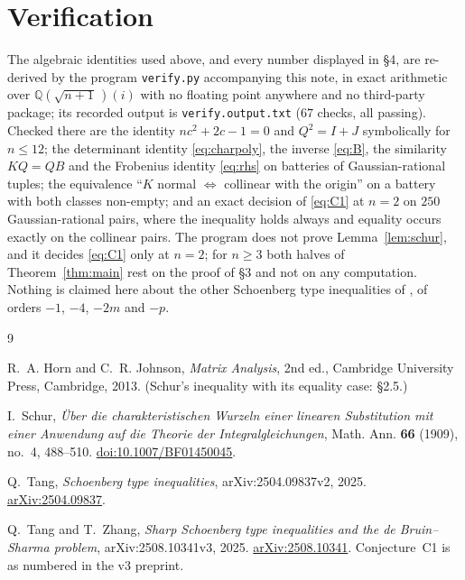 \documentclass[11pt]{amsart}
\theoremstyle{remark}
\begin{document}
\section{Verification}

The algebraic identities used above, and every number displayed in \S4, are
re-derived by the program \texttt{verify.py} accompanying this note, in exact
arithmetic over $\mathbb{Q}(\sqrt{n+1}\,)(i)$ with no floating point anywhere
and no third-party package; its recorded output is \texttt{verify.output.txt}
($67$ checks, all passing). Checked there are the identity $nc^{2}+2c-1=0$ and
$Q^{2}=I+J$ symbolically for $n\le12$; the determinant identity
\eqref{eq:charpoly}, the inverse \eqref{eq:B}, the similarity $KQ=QB$ and the
Frobenius identity \eqref{eq:rhs} on batteries of Gaussian-rational tuples; the
equivalence ``$K$ normal $\iff$ collinear with the origin'' on a battery with
both classes non-empty; and an exact decision of \eqref{eq:C1} at $n=2$ on
$250$ Gaussian-rational pairs, where the inequality holds always and equality
occurs exactly on the collinear pairs. The program does not prove
Lemma~\ref{lem:schur}, and it decides \eqref{eq:C1} only at $n=2$; for
$n\ge3$ both halves of Theorem~\ref{thm:main} rest on the proof of \S3 and not
on any computation. Nothing is claimed here about the other Schoenberg type
inequalities of \cite{TZ}, of orders $-1$, $-4$, $-2m$ and $-p$.

\begin{thebibliography}{9}

R.~A. Horn and C.~R. Johnson,
\emph{Matrix Analysis}, 2nd ed.,
Cambridge University Press, Cambridge, 2013.
(Schur's inequality with its equality case: \S2.5.)

I.~Schur,
\emph{\"Uber die charakteristischen Wurzeln einer linearen Substitution mit
einer Anwendung auf die Theorie der Integralgleichungen},
Math. Ann. \textbf{66} (1909), no.~4, 488--510.
\href{https://doi.org/10.1007/BF01450045}{doi:10.1007/BF01450045}.

Q.~Tang,
\emph{Schoenberg type inequalities},
arXiv:2504.09837v2, 2025.
\href{https://arxiv.org/abs/2504.09837}{arXiv:2504.09837}.

Q.~Tang and T.~Zhang,
\emph{Sharp Schoenberg type inequalities and the de Bruin--Sharma problem},
arXiv:2508.10341v3, 2025.
\href{https://arxiv.org/abs/2508.10341}{arXiv:2508.10341}.
Conjecture~C1 is as numbered in the v3 preprint.

\end{thebibliography}
\end{document}
